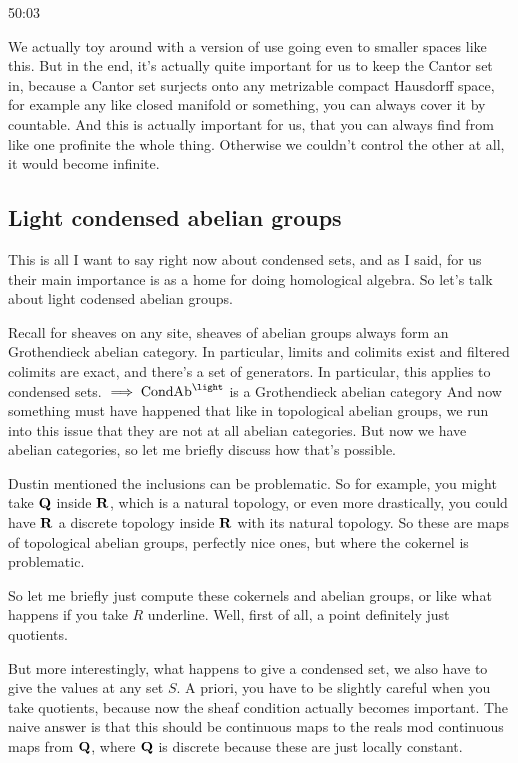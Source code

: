 \begin{example}
\begin{unfinished}{50:03}
\begin{remark}
We actually toy around with a version of use going even to smaller spaces like this. But in the end, it's actually quite important for us to keep the Cantor set in, because a Cantor set surjects onto any metrizable compact Hausdorff space, for example any like closed manifold or something, you can always cover it by countable. And this is actually important for us, that you can always find from like one profinite the whole thing. Otherwise we couldn't control the other at all, it would become infinite.

\subsection{Light condensed abelian groups} \label{subsec:light_condensed_abelian_groups}

This is all I want to say right now about condensed sets, and as I said, for us their main importance is as a home for doing homological algebra. So let's talk about light codensed abelian groups.

Recall for sheaves on any site, sheaves of abelian groups always form an Grothendieck abelian category. In particular, limits and colimits exist and filtered colimits are exact, and there's a set of generators. 
In particular, this applies to condensed sets.
$\implies \Cond\Ab^{\light}$ is a Grothendieck abelian category
And now something must have happened that like in topological abelian groups, we run into this issue that they are not at all abelian categories. But now we have abelian categories, so let me briefly discuss how that's possible.

\begin{example}


Dustin mentioned the inclusions can be problematic. So for example, you might take $\mathbf Q$ inside $\mathbf R$, which is a natural topology, or even more drastically, you could have $\mathbf R$ a discrete topology inside $\mathbf R$ with its natural topology. So these are maps of topological abelian groups, perfectly nice ones, but where the cokernel is problematic.

So let me briefly just compute these cokernels and abelian groups, 
or like what happens if you take $R$ underline. Well, first of all, a point definitely just quotients.

But more interestingly, what happens to give a condensed set, we also have to give the values at any set $S$. A priori, you have to be slightly careful when you take quotients, because now the sheaf condition actually becomes important. The naive answer is that this should be continuous maps to the reals mod continuous maps from $\mathbf Q$, where $\mathbf Q$ is discrete because these are just locally constant.


\end{example}
\end{remark}
\end{unfinished}
\end{example}
